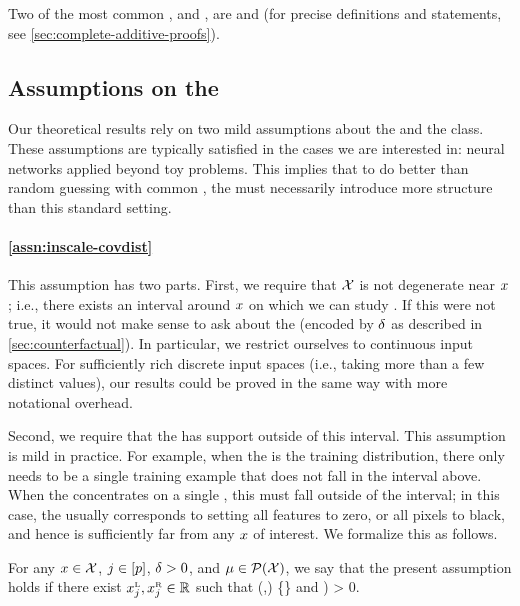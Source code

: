 %


Two of the most common \fielddefnames{}, \shap{} \citep{lundberg17shapley} and \intgrad{} \citep{sundararajan17integrated}, are \completename{} and \additivename{} (for precise definitions and statements, see \cref{sec:complete-additive-proofs}).

\subsection{Assumptions on the \modelName{} }

Our theoretical results rely on two mild assumptions about the \covnames{} and the \modelname{} class.
These assumptions are typically satisfied in the cases we are interested in: neural networks applied beyond toy problems. %
This implies that to
%
do better than random guessing with common \fielddefnames{}, the \username{} must necessarily introduce more structure than this standard setting.

\paragraph{\cref{assn:inscale-covdist} \intuitive{}}
This assumption has two parts.
First, we require that $\mathcal{X}$ is not degenerate near $x$; i.e., there exists an interval around $x$ on which we can study \countmodbehaviourname{}.
If this were not true, it would not make sense to ask about the \modbehaviourname{}  (encoded by $\delta$ as described in \cref{sec:counterfactual}).
%
In particular, we restrict ourselves to continuous input spaces. For sufficiently rich discrete input spaces (i.e., taking more than a few distinct values), our results could be proved in the same way with more notational overhead.
%

%
Second, we require that the \basename{} has support outside of this interval.
%
%
This assumption is mild in practice.
For example, when the \basename{} is the training distribution, there only needs to be a single training example that does not fall in the interval above.
When the \basename{} concentrates on a single \obsname{}, this \obsname{} must fall outside of the interval; in this case, the \basename{} \obsname{} usually corresponds to setting all features to zero, or all pixels to black, and hence is sufficiently far from any $x$ of interest. We formalize this as follows.

\begin{assumption}\label{assn:inscale-covdist}
For any \obsname{} $x\in\mathcal{X}$, \covname{} $j\in[p]$, \radiusname{} $\delta>0$, and \basename{} $\mu\in\mathcal{P}(\mathcal{X})$, we say that the present assumption holds if there exist $x^{\text{\tiny L}}_{j},x^{\text{\tiny R}}_{j}\in\mathbb{R}$ such that
\*[\label{eqn:inscale-covdist}
    [\covval\feat{j}-\inscale,\covval\feat{j}+\inscale] \subseteq (\covleft{},\covright{}) \subseteq \{\covvaldum{}\setdelim\covvaldum\in\covspace\}
\]
and
\*[
    \covdist\feat{j}\Big((\covleft\feat{j}, \covright\feat{j}) \setminus [\covval\feat{j}-\inscale\feat{j}, \covval\feat{j}+\inscale\feat{j}]\Big) > 0.
\]
\end{assumption}



